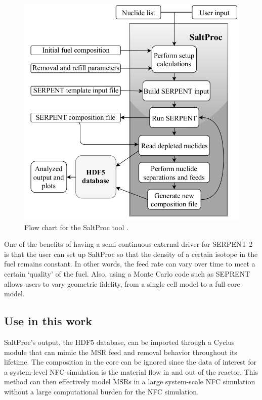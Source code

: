 \begin{figure}[htbp!]
	\begin{center}
		\includegraphics[scale=0.5]{./images/saltproc.png}
	\end{center}
	\caption{Flow chart for the SaltProc tool
		\cite{rykhlevskii_online_2017}.}
	\label{fig:SaltProc}
\end{figure}


One of the benefits of having a semi-continuous external driver for
SERPENT 2 is that the user can set up SaltProc so that the density
of a certain isotope in the fuel remains constant. In other words,
the feed rate can vary over time to meet a certain `quality' of the fuel.
Also, using a Monte Carlo code such as SEPRENT allows users to vary
geometric fidelity, from a single cell model to a full core model.

\subsection{Use in this work}
SaltProc's output, the HDF5 database, can be imported through a Cyclus
module that can mimic the \gls{MSR} feed and removal
behavior throughout its lifetime. The composition in the core can
be ignored since the data of interest for a system-level \gls{NFC} simulation
is the material flow in and out of the reactor. This method can
then effectively model \glspl{MSR} in a large system-scale \gls{NFC}
simulation without a large computational burden for the \gls{NFC} simulation.